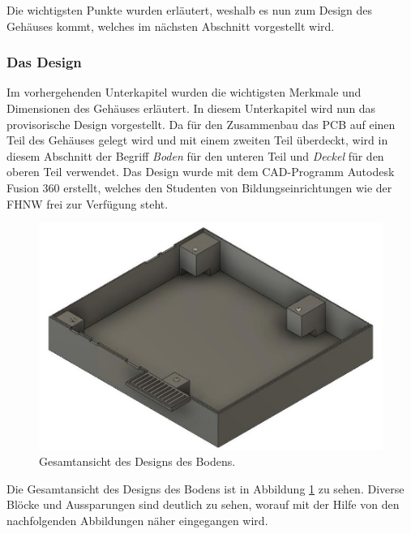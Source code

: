 Die wichtigsten Punkte wurden erläutert, weshalb es nun zum Design des Gehäuses kommt, welches im nächsten Abschnitt vorgestellt wird.

\subsubsection{Das Design}
Im vorhergehenden Unterkapitel wurden die wichtigsten Merkmale und Dimensionen des Gehäuses erläutert. In diesem Unterkapitel wird nun das provisorische Design vorgestellt. Da für den Zusammenbau das PCB auf einen Teil des Gehäuses gelegt wird und mit einem zweiten Teil überdeckt, wird in diesem Abschnitt der Begriff \textit{Boden} für den unteren Teil und \textit{Deckel} für den oberen Teil verwendet. Das Design wurde mit dem CAD-Programm Autodesk Fusion 360 erstellt, welches den Studenten von Bildungseinrichtungen wie der FHNW frei zur Verfügung steht.
\newpage

\begin{figure}[h]
\centering
\includegraphics[width=0.99\linewidth]{graphics/Gehaeuse/Design_Boden.jpg}
\caption{Gesamtansicht des Designs des Bodens.}
\label{fig:D:Boden}
\end{figure}

Die Gesamtansicht des Designs des Bodens ist in Abbildung \ref{fig:D:Boden} zu sehen. Diverse Blöcke und Aussparungen sind deutlich zu sehen, worauf mit der Hilfe von den nachfolgenden Abbildungen näher eingegangen wird.\\

